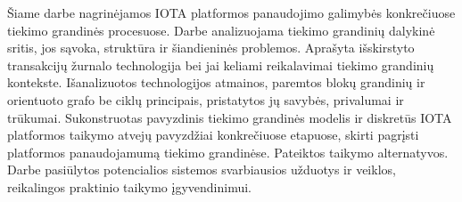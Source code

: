 

Šiame darbe nagrinėjamos IOTA platformos panaudojimo galimybės konkrečiuose tiekimo grandinės procesuose. 
Darbe analizuojama tiekimo grandinių dalykinė sritis, jos sąvoka, struktūra ir šiandieninės problemos.
Aprašyta išskirstyto transakcijų žurnalo technologija bei jai keliami reikalavimai tiekimo grandinių kontekste. Išanalizuotos technologijos atmainos, paremtos blokų grandinių ir orientuoto grafo be ciklų principais, pristatytos jų savybės, privalumai ir trūkumai. 
Sukonstruotas pavyzdinis tiekimo grandinės modelis ir diskretūs IOTA platformos taikymo atvejų pavyzdžiai konkrečiuose etapuose, skirti pagrįsti platformos panaudojamumą tiekimo grandinėse. Pateiktos taikymo alternatyvos. 
Darbe pasiūlytos potencialios sistemos svarbiausios užduotys ir veiklos, reikalingos praktinio taikymo įgyvendinimui.

